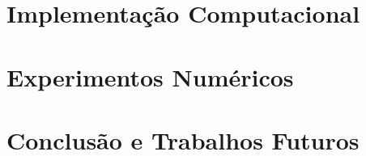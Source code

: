 \documentclass[dsc,numbers]{coppe}
\begin{document}
  \chapter{Implementação Computacional}\label{ch:implementacao}

  \chapter{Experimentos Numéricos}
  

  \chapter{Conclusão e Trabalhos Futuros}

  \backmatter
  
  

  \appendix
  
  
\end{document}
